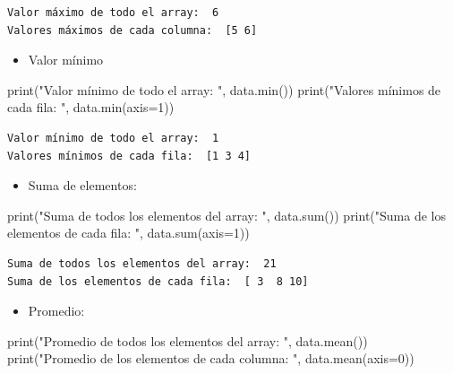 \documentclass[
  letterpaper,
  DIV=11,
  numbers=noendperiod]{scrreprt}
\newenvironment{Shaded}{\begin{snugshade}}{\end{snugshade}}
\newcommand{\BuiltInTok}[1]{\textcolor[rgb]{0.00,0.23,0.31}{#1}}
\newcommand{\DecValTok}[1]{\textcolor[rgb]{0.68,0.00,0.00}{#1}}
\newcommand{\NormalTok}[1]{\textcolor[rgb]{0.00,0.23,0.31}{#1}}
\newcommand{\OperatorTok}[1]{\textcolor[rgb]{0.37,0.37,0.37}{#1}}
\newcommand{\StringTok}[1]{\textcolor[rgb]{0.13,0.47,0.30}{#1}}
\providecommand{\tightlist}{%
  \setlength{\itemsep}{0pt}\setlength{\parskip}{0pt}}\usepackage{longtable,booktabs,array}
\begin{document}
\begin{verbatim}
Valor máximo de todo el array:  6
Valores máximos de cada columna:  [5 6]
\end{verbatim}

\begin{itemize}
\tightlist
\item
  Valor mínimo
\end{itemize}

\begin{Shaded}
\begin{Highlighting}[]
\BuiltInTok{print}\NormalTok{(}\StringTok{"Valor mínimo de todo el array: "}\NormalTok{, data.}\BuiltInTok{min}\NormalTok{())}
\BuiltInTok{print}\NormalTok{(}\StringTok{"Valores mínimos de cada fila: "}\NormalTok{, data.}\BuiltInTok{min}\NormalTok{(axis}\OperatorTok{=}\DecValTok{1}\NormalTok{))}
\end{Highlighting}
\end{Shaded}

\begin{verbatim}
Valor mínimo de todo el array:  1
Valores mínimos de cada fila:  [1 3 4]
\end{verbatim}

\begin{itemize}
\tightlist
\item
  Suma de elementos:
\end{itemize}

\begin{Shaded}
\begin{Highlighting}[]
\BuiltInTok{print}\NormalTok{(}\StringTok{"Suma de todos los elementos del array: "}\NormalTok{, data.}\BuiltInTok{sum}\NormalTok{())}
\BuiltInTok{print}\NormalTok{(}\StringTok{"Suma de los elementos de cada fila: "}\NormalTok{, data.}\BuiltInTok{sum}\NormalTok{(axis}\OperatorTok{=}\DecValTok{1}\NormalTok{))}
\end{Highlighting}
\end{Shaded}

\begin{verbatim}
Suma de todos los elementos del array:  21
Suma de los elementos de cada fila:  [ 3  8 10]
\end{verbatim}

\begin{itemize}
\tightlist
\item
  Promedio:
\end{itemize}

\begin{Shaded}
\begin{Highlighting}[]
\BuiltInTok{print}\NormalTok{(}\StringTok{"Promedio de todos los elementos del array: "}\NormalTok{, data.mean())}
\BuiltInTok{print}\NormalTok{(}\StringTok{"Promedio de los elementos de cada columna: "}\NormalTok{, data.mean(axis}\OperatorTok{=}\DecValTok{0}\NormalTok{))}
\end{Highlighting}
\end{Shaded}
\end{document}
